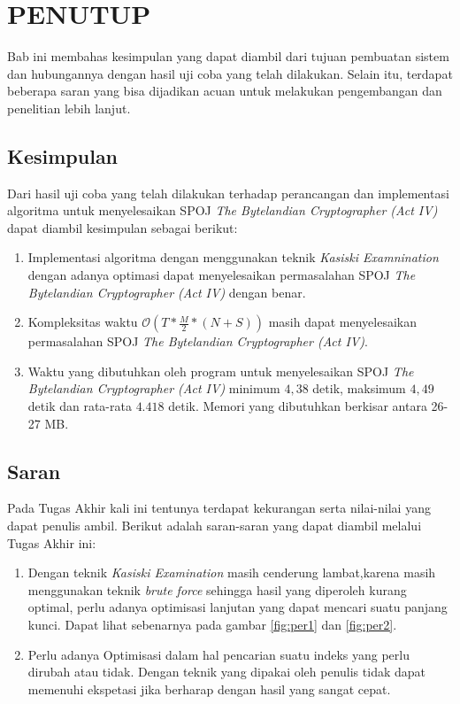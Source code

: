 \chapter{PENUTUP}
  Bab ini membahas kesimpulan yang dapat diambil dari tujuan pembuatan sistem dan hubungannya dengan hasil uji coba yang telah dilakukan. Selain itu, terdapat beberapa saran yang bisa dijadikan acuan untuk melakukan pengembangan dan penelitian lebih lanjut.
  \section{Kesimpulan}
 Dari hasil uji coba yang telah dilakukan terhadap perancangan dan implementasi algoritma untuk menyelesaikan SPOJ \textit{The Bytelandian Cryptographer (Act IV)} dapat diambil kesimpulan sebagai berikut:
 
 \begin{enumerate}
 \item Implementasi algoritma dengan menggunakan teknik \textit{Kasiski Examnination} dengan adanya optimasi dapat menyelesaikan permasalahan SPOJ \textit{The Bytelandian Cryptographer (Act IV)} dengan benar.
 \item Kompleksitas waktu $\mathcal{O}(T*\frac{M}{2}*(N+S))$ masih dapat menyelesaikan permasalahan SPOJ \textit{The Bytelandian Cryptographer (Act IV)}.
 \item Waktu yang dibutuhkan oleh program untuk menyelesaikan SPOJ \textit{The Bytelandian Cryptographer (Act IV)} minimum $4,38$ detik, maksimum $4,49$ detik dan rata-rata $4.418$ detik. Memori yang dibutuhkan berkisar antara 26-27 MB. %
 \end{enumerate}
  
  \section{Saran}
  Pada Tugas Akhir kali ini tentunya terdapat kekurangan serta nilai-nilai yang dapat penulis ambil. Berikut adalah saran-saran yang dapat diambil melalui Tugas Akhir ini:
  \begin{enumerate}
    \item Dengan teknik \textit{Kasiski Examination} masih cenderung lambat,karena masih menggunakan teknik \textit{brute force} sehingga hasil yang diperoleh kurang optimal, perlu adanya optimisasi lanjutan yang dapat mencari suatu panjang kunci. Dapat lihat sebenarnya pada gambar \ref{fig:per1} dan \ref{fig:per2}.%
    \item Perlu adanya Optimisasi dalam hal pencarian suatu indeks yang perlu dirubah atau tidak. Dengan teknik yang dipakai oleh penulis tidak dapat memenuhi ekspetasi jika berharap dengan hasil yang sangat cepat.
    
  \end{enumerate}
  
